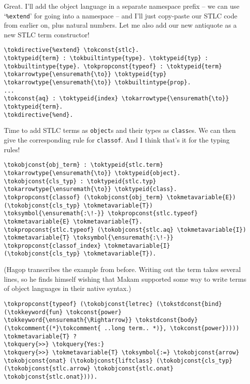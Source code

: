 \heroADVISOR{} Great. I'll add the object language in a separate namespace
prefix -- we can use `\texttt{\%extend}' for going into a namespace --
and I'll just copy-paste our STLC code from earlier on, plus natural
numbers. Let me also add our new antiquote as a new STLC term
constructor!

\begin{verbatim}
\tokdirective{%extend} \tokconst{stlc}.
\toktypeid{term} : \tokbuiltintype{type}. \toktypeid{typ} : \tokbuiltintype{type}. \tokpropconst{typeof} : \toktypeid{term} \tokarrowtype{\ensuremath{\to}} \toktypeid{typ} \tokarrowtype{\ensuremath{\to}} \tokbuiltintype{prop}.
...
\tokconst{aq} : \toktypeid{index} \tokarrowtype{\ensuremath{\to}} \toktypeid{term}.
\tokdirective{%end}.
\end{verbatim}

\heroSTUDENT{} Time to add STLC terms as \texttt{object}s and their types as
\texttt{class}es. We can then give the corresponding rule for
\texttt{classof}. And I think that's it for the typing rules!

\begin{verbatim}
\tokobjconst{obj_term} : \toktypeid{stlc.term} \tokarrowtype{\ensuremath{\to}} \toktypeid{object}. \tokobjconst{cls_typ} : \toktypeid{stlc.typ} \tokarrowtype{\ensuremath{\to}} \toktypeid{class}.
\tokpropconst{classof} (\tokobjconst{obj_term} \tokmetavariable{E}) (\tokobjconst{cls_typ} \tokmetavariable{T}) \toksymbol{\ensuremath{:\!-}} \tokpropconst{stlc.typeof} \tokmetavariable{E} \tokmetavariable{T}.
\tokpropconst{stlc.typeof} (\tokobjconst{stlc.aq} \tokmetavariable{I}) \tokmetavariable{T} \toksymbol{\ensuremath{:\!-}} \tokpropconst{classof_index} \tokmetavariable{I} (\tokobjconst{cls_typ} \tokmetavariable{T}).
\end{verbatim}

\begin{scenecomment}
(Hagop transcribes the example from before. Writing out the term takes several lines, so he finds himself
wishing that Makam supported some way to write terms of object languages in their native syntax.)
\end{scenecomment}

\begin{verbatim}
\tokpropconst{typeof} (\tokobjconst{letrec} (\tokstdconst{bind} (\tokkeyword{fun} \tokconst{power} \tokkeyword{\ensuremath{\Rightarrow}} \tokstdconst{body} (\tokcomment{(*}\tokcomment{ ..long term.. *)}, \tokconst{power})))) \tokmetavariable{T} ?
\tokquery{>>} \tokquery{Yes:}
\tokquery{>>} \tokmetavariable{T} \toksymbol{:=} \tokobjconst{arrow} \tokobjconst{onat} (\tokobjconst{liftclass} (\tokobjconst{cls_typ} (\tokobjconst{stlc.arrow} \tokobjconst{stlc.onat} \tokobjconst{stlc.onat}))).
\end{verbatim}

